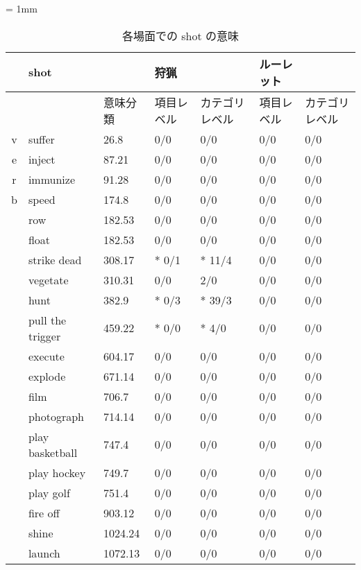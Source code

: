 \small
\begin{table}
  \caption{各場面での shot の意味}
  \label{shot}
  \begin{center}
    \tabcolsep = 1mm
    \begin{tabular}{|c|l|l||l|l||l|l|} \hline
      & shot       &          & 狩猟 & & ルーレット & \\ \hline
      &            & 意味分類 & 項目レベル & カテゴリレベル & 項目レベル & カテゴリレベル \\ \hline \hline
    v & suffer     & 26.8   & 0/0  & 0/0 & 0/0 & 0/0  \\
    e & inject     & 87.21  & 0/0  & 0/0 & 0/0 & 0/0 \\
    r & immunize   & 91.28  & 0/0  & 0/0 & 0/0 & 0/0 \\
    b & speed      & 174.8  & 0/0  & 0/0 & 0/0 & 0/0 \\
      & row        & 182.53 & 0/0  & 0/0 & 0/0 & 0/0 \\
      & float      & 182.53 & 0/0  & 0/0 & 0/0 & 0/0 \\
      & strike dead & 308.17 &* 0/1 &* 11/4 & 0/0 & 0/0 \\
      & vegetate   & 310.31 & 0/0  & 2/0 & 0/0 & 0/0 \\
      & hunt       & 382.9  &* 0/3 &* 39/3 & 0/0 & 0/0 \\
      & pull the trigger & 459.22 &* 0/0 &* 4/0 & 0/0 & 0/0 \\
      & execute    & 604.17 & 0/0  & 0/0 & 0/0 & 0/0 \\
      & explode    & 671.14 & 0/0  & 0/0 & 0/0 & 0/0 \\
      & film       & 706.7  & 0/0  & 0/0 & 0/0 & 0/0 \\
      & photograph & 714.14 & 0/0  & 0/0 & 0/0 & 0/0 \\
      & play basketball & 747.4 & 0/0 & 0/0 & 0/0 & 0/0 \\
      & play hockey & 749.7 & 0/0 & 0/0 & 0/0 & 0/0 \\
      & play golf  & 751.4  & 0/0 & 0/0 & 0/0 & 0/0 \\
      & fire off   & 903.12 & 0/0 & 0/0 & 0/0 & 0/0 \\
      & shine      & 1024.24 & 0/0 & 0/0 & 0/0 & 0/0 \\
      & launch     & 1072.13 & 0/0 & 0/0 & 0/0 & 0/0 \\ \hline
    \end{tabular}
  \end{center}
  \vspace{-2mm}
\end{table}
\normalsize

